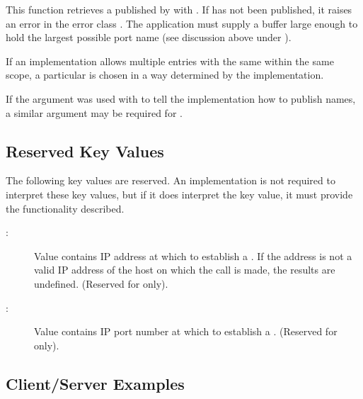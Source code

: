 This function retrieves a  published
by  with .
If  has not been published, it raises
an error in the error class . The application
must supply a  buffer large enough
to hold the largest possible port name (see discussion above under
).



If an implementation allows multiple entries with
the same  within the same scope,
a particular  is chosen in a way
determined by the implementation.

If the  argument was used with
 to tell the implementation
how to publish names, a similar  argument
may be required for .




\subsection{Reserved Key Values}
\label{subsec:cskeys}

The following key values are reserved. An implementation is not required to
interpret these key values, but if it does interpret the key value, it
must provide the functionality described.

\begin{description}

\item[:] Value contains IP address at which to
establish a . If the address is not a valid IP address of
the host on which the  call is made,
the results are undefined. (Reserved for 
only).
\item[:] Value contains IP port number at which to
establish a . (Reserved for 
only).
\end{description}



\subsection{Client/Server Examples}
\label{subsec:csexamples}

